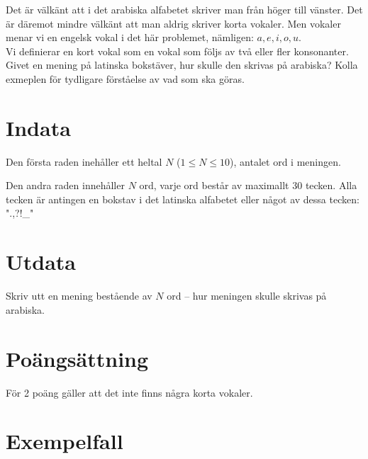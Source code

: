 

Det är välkänt att i det arabiska alfabetet skriver man från höger till vänster. Det är däremot mindre välkänt att man aldrig skriver korta vokaler. Men vokaler menar vi en engelsk vokal i det här problemet, nämligen: $a,e,i,o,u$.\\ Vi definierar en kort vokal som en vokal som följs av två eller fler konsonanter.\\ Givet en mening på latinska bokstäver, hur skulle den skrivas på arabiska? Kolla exmeplen för tydligare förståelse av vad som ska göras.


\section*{Indata}
Den första raden inehåller ett heltal $N$ ($1 \le N \le 10$), antalet ord i meningen.

Den andra raden innehåller $N$ ord, varje ord består av maximallt 30 tecken. Alla tecken är antingen en bokstav i det latinska alfabetet eller något av dessa tecken: ".,?!\_"

\section*{Utdata}
Skriv utt en mening bestående av $N$ ord -- hur meningen skulle skrivas på arabiska.
\section*{Poängsättning}
För 2 poäng gäller att det inte finns några korta vokaler. \\


\section*{Exempelfall}
